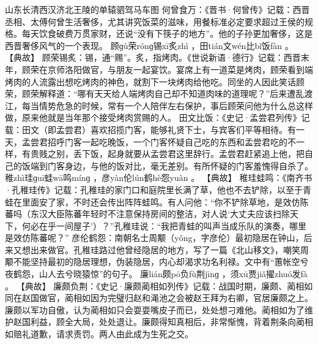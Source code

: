 \documentclass[12pt,UTF8]{ctexbook}
\begin{document}
山东长清西汉济北王陵的单辕驷驾马车图
何曾食万：《晋书·何曾传》记载：西晋丞相、太傅何曾生活奢侈，尤其讲究饭菜的滋味，用餐标准必定要求超过王侯的规格。每天饮食破费万贯家财，还说“没有下筷子的地方”。他的子孙更加奢侈，这是西晋奢侈风气的一个表现。
顾ɡù荣rónɡ锡xī炙zhì
，田tián文wén比bǐ饭fàn
。
【典故】
顾荣锡炙：锡，通“赐”。炙，指烤肉。《世说新语·德行》记载：西晋末年，顾荣在京师洛阳做官，与朋友一起宴饮。宴席上有一道菜是烤肉，顾荣看到端烤肉的人流露出想吃烤肉的神色，就割下一块烤肉给他吃。同坐的人因此笑话顾荣，顾荣解释道：“哪有天天给人端烤肉自己却不知道肉味的道理呢？”后来遭乱渡江，每当情势危急的时候，常有一个人陪伴左右保护，事后顾荣问他为什么总这样做，原来他就是当年那个接受烤肉赏赐的人。
田文比饭：《史记·孟尝君列传》记载：田文（即孟尝君）喜欢招揽门客，能够礼贤下士，与宾客们平等相待。有一天，孟尝君招呼门客一起吃晚饭，一个门客怀疑自己吃的东西和孟尝君吃的不一样，有贵贱之别，丢下饭，起身就要从孟尝君这里辞行。孟尝君赶紧追上他，把自己的饭端到门客身边，与他的饭对比，毫无差别。有所怀疑的门客羞愧得自杀了。
稚zhì珪ɡuī蛙wā鸣mínɡ
，彦yàn伦lún鹤hè怨yuàn
。
【典故】
稚珪蛙鸣：《南齐书·孔稚珪传》记载：孔稚珪的家门口和庭院里长满了草，他也不去铲除，以至于青蛙在里面安了家，不时还会传出阵阵蛙鸣。有人问他：“你不铲除草地，是效仿陈蕃吗（东汉大臣陈蕃年轻时不注意保持房间的整洁，对人说‘大丈夫应该扫除天下，何必在乎一间屋子’）？”孔稚珪说：“我把青蛙的叫声当成乐队的演奏，哪里是效仿陈蕃呢？”
彦伦鹤怨：南朝名士周颙（yǒng，字彦伦）最初隐居在钟山，后来又想出来做官。孔稚珪路过他曾经隐居的地方，写了一篇《北山移文》，嘲笑周颙不能坚持最初的隐居理想，伪装隐居，内心却渴求功名利禄。文中有“蕙帐空兮夜鹤怨，山人去兮晓猿惊”的句子。
廉lián颇pō负fù荆jīnɡ
，须xū贾jiǎ擢zhuó发fà
。
【典故】
廉颇负荆：《史记·廉颇蔺相如列传》记载：战国时期，廉颇、蔺相如同在赵国做官，蔺相如因为完璧归赵和渑池之会被赵王拜为右卿，官居廉颇之上。廉颇以军功自傲，认为蔺相如只会耍耍嘴皮子而已，处处想刁难他。蔺相如为了维护赵国利益，顾全大局，处处退让。廉颇得知真相后，非常惭愧，背着荆条向蔺相如赔礼道歉，请求责罚。两人由此成为生死之交。
\end{document}
